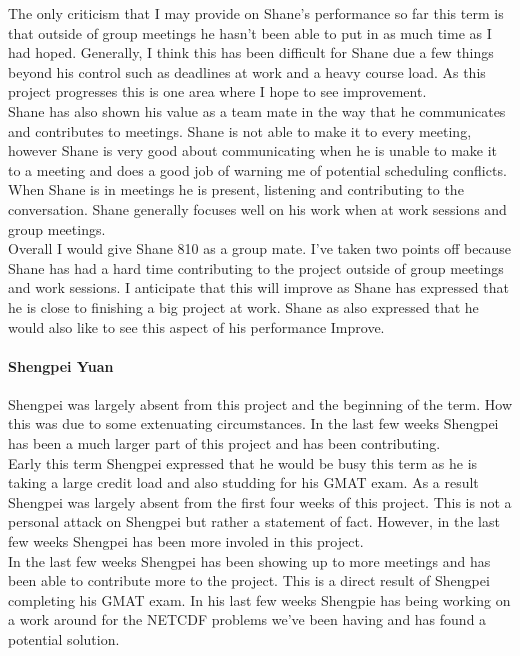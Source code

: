 \documentclass[onecolumn, draftclsnofoot,10pt, compsoc]{article}
\begin{document}
						The only criticism that I may provide on Shane's performance so far this term is that outside of group meetings he hasn't been able to put in as much time as I had hoped. Generally, I think this has been difficult for Shane due a few things beyond his control such as deadlines at work and a heavy course load. As this project progresses this is one area where I hope to see improvement.\\


			Shane has also shown his value as a team mate in the way that he communicates and contributes to meetings. Shane is not able to make it to every meeting, however Shane is very good about communicating when he is unable to make it to a meeting and does a good job of warning me of potential scheduling conflicts. When Shane is in meetings he is present, listening and contributing to the conversation. Shane generally focuses well on his work when at work sessions and group meetings.\\

			Overall I would give Shane 8\/10 as a group mate. I've taken two points off because Shane has had a hard time contributing to the project outside of group meetings and work sessions. I anticipate that this will improve as Shane has expressed that he is close to finishing a big project at work. Shane as also expressed that he would also like to see this aspect of his performance Improve.\\

		\paragraph{Shengpei Yuan} \hfill \break
		Shengpei was largely absent from this project and the beginning of the term. How this was due to some extenuating circumstances. In the last few weeks Shengpei has been a much larger part of this project and has been contributing.\\

		Early this term Shengpei expressed that he would be busy this term as he is taking a large credit load and also studding for his GMAT exam. As a result Shengpei was largely absent from the first four weeks of this project. This is not a personal attack on Shengpei but rather a statement of fact. However, in the last few weeks Shengpei has been more involed in this project.\\

		In the last few weeks Shengpei has been showing up to more meetings and has been able to contribute more to the project. This is a direct result of Shengpei completing his GMAT exam. In his last few weeks Shengpie has being working on a work around for the NETCDF problems we've been having and has found a potential solution.\\
\end{document}
